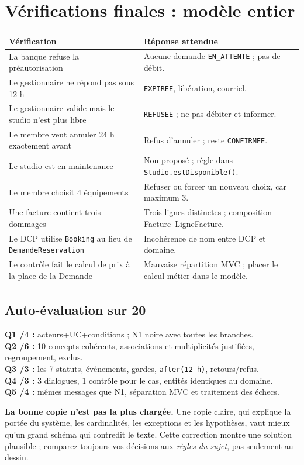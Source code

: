 \documentclass[10pt,a4paper]{article}
\begin{document}
\section{Vérifications finales : modèle entier}
\begin{tabularx}{\linewidth}{@{}p{48mm}X@{}}
\toprule
Vérification & Réponse attendue \\
\midrule
La banque refuse la préautorisation & Aucune demande \texttt{EN\_ATTENTE} ; pas de débit. \\
Le gestionnaire ne répond pas sous 12 h & \texttt{EXPIREE}, libération, courriel. \\
Le gestionnaire valide mais le studio n'est plus libre & \texttt{REFUSEE} ; ne pas débiter et informer. \\
Le membre veut annuler 24 h exactement avant & Refus d'annuler ; reste \texttt{CONFIRMEE}. \\
Le studio est en maintenance & Non proposé ; règle dans \texttt{Studio.estDisponible()}. \\
Le membre choisit 4 équipements & Refuser ou forcer un nouveau choix, car maximum 3. \\
Une facture contient trois dommages & Trois lignes distinctes ; composition Facture--LigneFacture. \\
Le DCP utilise \texttt{Booking} au lieu de \texttt{DemandeReservation} & Incohérence de nom entre DCP et domaine. \\
Le contrôle fait le calcul de prix à la place de la Demande & Mauvaise répartition MVC ; placer le calcul métier dans le modèle. \\
\bottomrule
\end{tabularx}
\subsection{Auto-évaluation sur 20}
\textbf{Q1 /4 :} acteurs+UC+conditions ; N1 noire avec toutes les branches.\\
\textbf{Q2 /6 :} 10 concepts cohérents, associations et multiplicités justifiées, regroupement, exclus.\\
\textbf{Q3 /3 :} les 7 statuts, événements, gardes, \texttt{after(12 h)}, retours/refus.\\
\textbf{Q4 /3 :} 3 dialogues, 1 contrôle pour le cas, entités identiques au domaine.\\
\textbf{Q5 /4 :} mêmes messages que N1, séparation MVC et traitement des échecs.

\begin{memo}
\textbf{La bonne copie n'est pas la plus chargée.} Une copie claire, qui explique la portée du système, les cardinalités, les exceptions et les hypothèses, vaut mieux qu'un grand schéma qui contredit le texte. Cette correction montre une solution plausible ; comparez toujours vos décisions aux \emph{règles du sujet}, pas seulement au dessin.
\end{memo}
\end{document}
